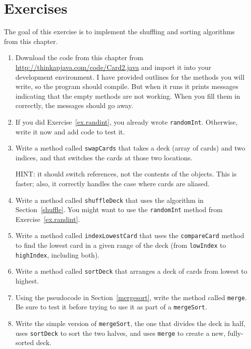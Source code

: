 \section{Exercises}

\begin{exercise}
The goal of this exercise is to implement the shuffling and
sorting algorithms from this chapter.

\begin{enumerate}

\item Download the code from this chapter from
\url{http://thinkapjava.com/code/Card2.java}
and import it into your development environment.  I have
provided outlines for the methods you will write, so the
program should compile.  But when it runs it prints messages
indicating that the empty methods are not working.  When you
fill them in correctly, the messages should go away.

\item If you did Exercise~\ref{ex.randint}, you already wrote
{\tt randomInt}.  Otherwise, write it now and add code to test it.

\item Write a method called {\tt swapCards} that takes a
deck (array of cards) and two indices, and that switches
the cards at those two locations.

HINT: it should switch references, not
the contents of the objects.  This is faster; also, it
correctly handles the case where cards are aliased.

\item Write a method called {\tt shuffleDeck} that uses the algorithm
in Section~\ref{shuffle}.  You might want to use the {\tt randomInt}
method from Exercise~\ref{ex.randint}.

\item Write a method called {\tt indexLowestCard} that uses
the {\tt compareCard} method to find the lowest card
in a given range of the deck (from {\tt lowIndex} to {\tt highIndex},
including both).

\item Write a method called {\tt sortDeck} that arranges
a deck of cards from lowest to highest.

\item Using the pseudocode in Section~\ref{mergesort}, write the
method called {\tt merge}.  Be sure to test it before trying to use it
as part of a {\tt mergeSort}.

\item Write the simple version of {\tt mergeSort}, the one that
divides the deck in half, uses {\tt sortDeck} to sort the two
halves, and uses {\tt merge} to create a new, fully-sorted deck.


\end{enumerate}
\end{exercise}

